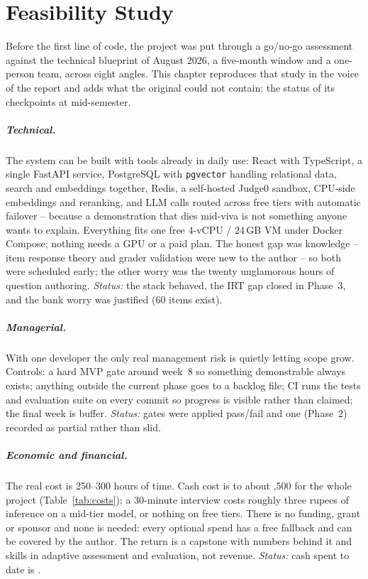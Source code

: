 \documentclass{tietreport}
\begin{document}
\chapter{Feasibility Study}
\label{ch:feasibility}

Before the first line of code, the project was put through a go/no-go assessment against the
technical blueprint of August 2026, a five-month window and a one-person team, across eight
angles. This chapter reproduces that study in the voice of the report and adds what the
original could not contain: the status of its checkpoints at mid-semester.

\paragraph{Technical.} The system can be built with tools already in daily use: React with TypeScript, a single FastAPI service, PostgreSQL with \texttt{pgvector} handling relational data, search and embeddings together, Redis, a self-hosted Judge0 sandbox, CPU-side embeddings and reranking, and LLM calls routed across free tiers with automatic failover -- because a demonstration that dies mid-viva is not something anyone wants to explain. Everything fits one free 4-vCPU / 24\,GB VM under Docker Compose; nothing needs a GPU or a paid plan. The honest gap was knowledge -- item response theory and grader validation were new to the author -- so both were scheduled early; the other worry was the twenty unglamorous hours of question authoring. \emph{Status:} the stack behaved, the IRT gap closed in Phase~3, and the bank worry was justified (60 items exist).

\paragraph{Managerial.} With one developer the only real management risk is quietly letting scope grow. Controls: a hard MVP gate around week~8 so something demonstrable always exists; anything outside the current phase goes to a backlog file; CI runs the tests and evaluation suite on every commit so progress is visible rather than claimed; the final week is buffer. \emph{Status:} gates were applied pass/fail and one (Phase~2) recorded as partial rather than slid.

\paragraph{Economic and financial.} The real cost is 250--300 hours of time. Cash cost is
 to about ,500 for the whole project (Table~\ref{tab:costs}); a 30-minute interview
costs roughly three rupees of inference on a mid-tier model, or nothing on free tiers. There is
no funding, grant or sponsor and none is needed: every optional spend has a free fallback and
can be covered by the author. The return is a capstone with numbers behind it and skills in
adaptive assessment and evaluation, not revenue. \emph{Status:} cash spent to date is .
\end{document}
